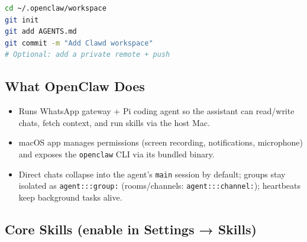 \begin{lstlisting}[language=bash]
cd ~/.openclaw/workspace
git init
git add AGENTS.md
git commit -m "Add Clawd workspace"
# Optional: add a private remote + push
\end{lstlisting}


\subsection{What OpenClaw Does}


\begin{itemize}
  \item Runs WhatsApp gateway + Pi coding agent so the assistant can read/write chats, fetch context, and run skills via the host Mac.
  \item macOS app manages permissions (screen recording, notifications, microphone) and exposes the \texttt{openclaw} CLI via its bundled binary.
  \item Direct chats collapse into the agent's \texttt{main} session by default; groups stay isolated as \texttt{agent:::group:} (rooms/channels: \texttt{agent:::channel:}); heartbeats keep background tasks alive.
\end{itemize}


\subsection{Core Skills (enable in Settings → Skills)}


